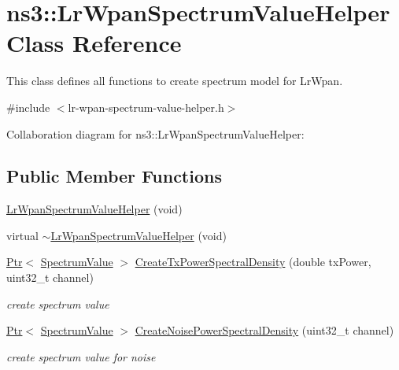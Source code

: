 \hypertarget{classns3_1_1LrWpanSpectrumValueHelper}{}\section{ns3\+:\+:Lr\+Wpan\+Spectrum\+Value\+Helper Class Reference}
\label{classns3_1_1LrWpanSpectrumValueHelper}


This class defines all functions to create spectrum model for Lr\+Wpan.  




{\ttfamily \#include $<$lr-\/wpan-\/spectrum-\/value-\/helper.\+h$>$}



Collaboration diagram for ns3\+:\+:Lr\+Wpan\+Spectrum\+Value\+Helper\+:
\subsection*{Public Member Functions}
\begin{DoxyCompactItemize}
\item 
\hyperlink{classns3_1_1LrWpanSpectrumValueHelper_a1aceee02f0f8edf6091f3e44e21179f3}{Lr\+Wpan\+Spectrum\+Value\+Helper} (void)
\item 
virtual \hyperlink{classns3_1_1LrWpanSpectrumValueHelper_ac3b8b9c31f5ba27a1e01906a64bbfa6d}{$\sim$\+Lr\+Wpan\+Spectrum\+Value\+Helper} (void)
\item 
\hyperlink{classns3_1_1Ptr}{Ptr}$<$ \hyperlink{classns3_1_1SpectrumValue}{Spectrum\+Value} $>$ \hyperlink{classns3_1_1LrWpanSpectrumValueHelper_af0ae8f605c101953da6475676047ae32}{Create\+Tx\+Power\+Spectral\+Density} (double tx\+Power, uint32\+\_\+t channel)
\begin{DoxyCompactList}\small\item\em create spectrum value \end{DoxyCompactList}\item 
\hyperlink{classns3_1_1Ptr}{Ptr}$<$ \hyperlink{classns3_1_1SpectrumValue}{Spectrum\+Value} $>$ \hyperlink{classns3_1_1LrWpanSpectrumValueHelper_a7cb76ff84cd11ab86100af9aa3c5e2a5}{Create\+Noise\+Power\+Spectral\+Density} (uint32\+\_\+t channel)
\begin{DoxyCompactList}\small\item\em create spectrum value for noise \end{DoxyCompactList}\end{DoxyCompactItemize}
